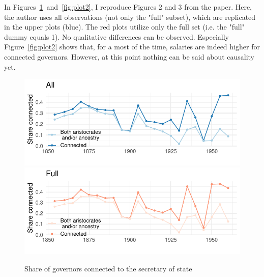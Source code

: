 \documentclass[a4paper]{article}\usepackage[]{graphicx}\usepackage[]{color}
\makeatletter
\def\maxwidth{ %
  \ifdim\Gin@nat@width>\linewidth
    \linewidth
  \else
    \Gin@nat@width
  \fi
}
\makeatother
\begin{document}
\hspace*{5mm} In Figures~\ref{fig:plot1}~and~\ref{fig:plot2}, I reproduce Figures 2 and 3 from the paper. Here, the author uses all observations (not only the "full" subset), which are replicated in the upper plots (blue). The red plots utilize only the full set (i.e. the "full" dummy equals 1). No qualitative differences can be observed. Especially Figure~\ref{fig:plot2} shows that, for a most of the time, salaries are indeed higher for connected governors. However, at this point nothing can be said about causality yet.    
\begin{figure}

{\centering \includegraphics[width=\maxwidth]{figure/plot1-1} 
\includegraphics[width=\maxwidth]{figure/plot1-2} 

}

\caption[Share of governors connected to the secretary of state]{Share of governors connected to the secretary of state}\label{fig:plot1}
\end{figure}
\end{document}

